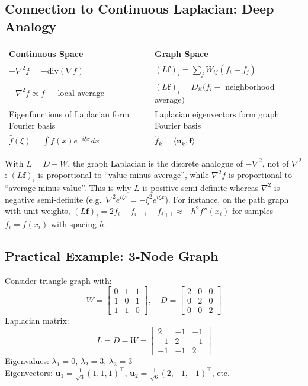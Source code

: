 \begin{notechapter}
\subsection{Connection to Continuous Laplacian: Deep Analogy}
\begin{tabular}{p{}p{}}
\textbf{Continuous Space} & \textbf{Graph Space} \\
\hline
$-\nabla^2 f = -\text{div}(\nabla f)$ & $(L\mathbf{f})_i = \sum_j W_{ij}(f_i-f_j)$ \\
$-\nabla^2 f \propto f - $ local average & $(L\mathbf{f})_i = D_{ii}(f_i - $ neighborhood average$)$ \\
Eigenfunctions of Laplacian form Fourier basis & Laplacian eigenvectors form graph Fourier basis \\
$\hat{f}(\xi) = \int f(x)e^{-i\xi x}dx$ & $\hat{f}_k = \langle \mathbf{u}_k, \mathbf{f} \rangle$ \\
\end{tabular}

\begin{remark}
With $L = D - W$, the graph Laplacian is the discrete analogue of $-\nabla^2$, not of $\nabla^2$:
$(L\mathbf{f})_i$ is proportional to ``value minus average'', while $\nabla^2 f$ is proportional to
``average minus value''. This is why $L$ is positive semi-definite whereas $\nabla^2$ is
negative semi-definite (e.g.\ $\nabla^2 e^{i\xi x} = -\xi^2 e^{i\xi x}$). For instance, on the path
graph with unit weights, $(L\mathbf{f})_i = 2f_i - f_{i-1} - f_{i+1} \approx -h^2 f''(x_i)$ for samples
$f_i = f(x_i)$ with spacing $h$.
\end{remark}

\subsection{Practical Example: 3-Node Graph}
Consider triangle graph with:
\[
W = \begin{bmatrix}
0 & 1 & 1 \\
1 & 0 & 1 \\
1 & 1 & 0
\end{bmatrix}, \quad
D = \begin{bmatrix}
2 & 0 & 0 \\
0 & 2 & 0 \\
0 & 0 & 2
\end{bmatrix}
\]
Laplacian matrix:
\[
L = D-W = \begin{bmatrix}
2 & -1 & -1 \\
-1 & 2 & -1 \\
-1 & -1 & 2
\end{bmatrix}
\]
Eigenvalues: $\lambda_1=0$, $\lambda_2=3$, $\lambda_3=3$ \\
Eigenvectors: $\mathbf{u}_1=\frac{1}{\sqrt{3}}(1,1,1)^\top$, 
$\mathbf{u}_2=\frac{1}{\sqrt{6}}(2,-1,-1)^\top$, etc.



\end{notechapter}
